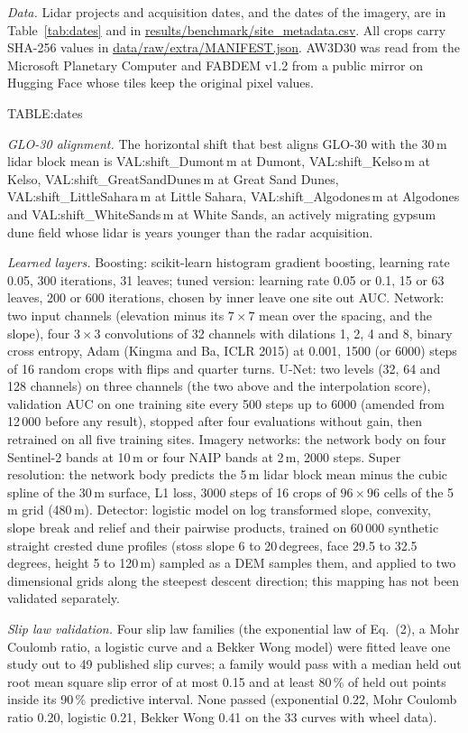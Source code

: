 \textit{Data.} Lidar projects and acquisition dates, and the dates of the imagery, are in Table~\ref{tab:dates} and in \url{results/benchmark/site_metadata.csv}. All crops carry SHA-256 values in \url{data/raw/extra/MANIFEST.json}. AW3D30 was read from the Microsoft Planetary Computer and FABDEM v1.2 from a public mirror on Hugging Face whose tiles keep the original pixel values.

{{TABLE:dates}}

\textit{GLO-30 alignment.} The horizontal shift that best aligns GLO-30 with the 30\,m lidar block mean is {{VAL:shift_Dumont}}\,m at Dumont, {{VAL:shift_Kelso}}\,m at Kelso, {{VAL:shift_GreatSandDunes}}\,m at Great Sand Dunes, {{VAL:shift_LittleSahara}}\,m at Little Sahara, {{VAL:shift_Algodones}}\,m at Algodones and {{VAL:shift_WhiteSands}}\,m at White Sands, an actively migrating gypsum dune field whose lidar is years younger than the radar acquisition.

\textit{Learned layers.} Boosting: scikit-learn histogram gradient boosting, learning rate 0.05, 300 iterations, 31 leaves; tuned version: learning rate 0.05 or 0.1, 15 or 63 leaves, 200 or 600 iterations, chosen by inner leave one site out AUC. Network: two input channels (elevation minus its $7\times7$ mean over the spacing, and the slope), four $3\times3$ convolutions of 32 channels with dilations 1, 2, 4 and 8, binary cross entropy, Adam (Kingma and Ba, ICLR 2015) at 0.001, 1500 (or 6000) steps of 16 random crops with flips and quarter turns. U-Net: two levels (32, 64 and 128 channels) on three channels (the two above and the interpolation score), validation AUC on one training site every 500 steps up to 6000 (amended from 12\,000 before any result), stopped after four evaluations without gain, then retrained on all five training sites. Imagery networks: the network body on four Sentinel-2 bands at 10\,m or four NAIP bands at 2\,m, 2000 steps. Super resolution: the network body predicts the 5\,m lidar block mean minus the cubic spline of the 30\,m surface, L1 loss, 3000 steps of 16 crops of $96\times96$ cells of the 5\,m grid (480\,m). Detector: logistic model on log transformed slope, convexity, slope break and relief and their pairwise products, trained on 60\,000 synthetic straight crested dune profiles (stoss slope 6 to 20\,degrees, face 29.5 to 32.5\,degrees, height 5 to 120\,m) sampled as a DEM samples them, and applied to two dimensional grids along the steepest descent direction; this mapping has not been validated separately.

\textit{Slip law validation.} Four slip law families (the exponential law of Eq.~(2), a Mohr Coulomb ratio, a logistic curve and a Bekker Wong model) were fitted leave one study out to 49 published slip curves; a family would pass with a median held out root mean square slip error of at most 0.15 and at least 80\,\% of held out points inside its 90\,\% predictive interval. None passed (exponential 0.22, Mohr Coulomb ratio 0.20, logistic 0.21, Bekker Wong 0.41 on the 33 curves with wheel data).

